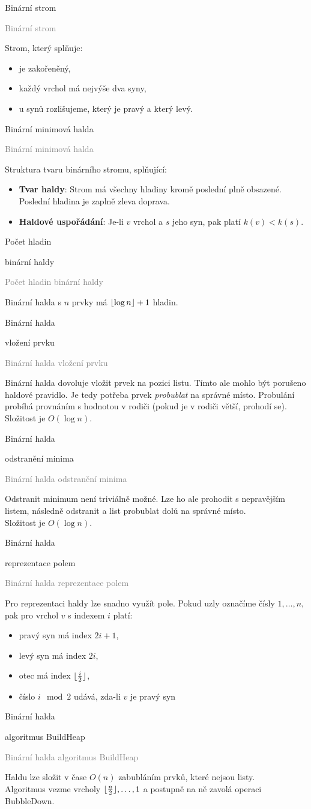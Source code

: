 \documentclass[20pt]{extarticle}
\newcommand{\card}[3][]{
	\vspace*{\fill}

	\newpage
	\topskip0pt
	\vspace*{\fill}
		\Large #2

		\vspace{1cm}
		\normalsize #1
	\vspace*{\fill}
	\newpage

	\small \textcolor{gray}{#2 #1}
	\topskip0pt
	\vspace*{\fill}

	\normalsize
	#3
	\vspace*{\fill}
}
\DeclarePairedDelimiter{\floor}{\lfloor}{\rfloor}
\begin{document}
\begin{center}
\card{Binární strom}{
	Strom, který splňuje:
	\begin{itemize}
		\item je zakořeněný,
		\item každý vrchol má nejvýše dva syny,
		\item u synů rozlišujeme, který je pravý a který levý.
	\end{itemize}
}

\card{Binární minimová halda}{
	Struktura tvaru binárního stromu, splňující:
	\begin{itemize}
		\item \textbf{Tvar haldy}: Strom má všechny hladiny kromě poslední plně obsazené.
		Poslední hladina je zaplně zleva doprava.
		\item \textbf{Haldové uspořádání}: Je-li $v$ vrchol a $s$ jeho syn,
		pak platí $k(v)<k(s)$.
	\end{itemize}
}

\card[binární haldy]{Počet hladin}{
	Binární halda s $n$ prvky má $\floor{\log n} + 1$  hladin.
}

\card[vložení prvku]{Binární halda}{
	Binární halda dovoluje vložit prvek na pozici listu. Tímto ale mohlo být
	porušeno haldové pravidlo. Je tedy potřeba prvek \textit{probublat} na
	správné místo. Probulání probíhá provnáním s hodnotou v rodiči (pokud je v
	rodiči větší, prohodí se).\\
	Složitost je $O(\log n)$.
}

\card[odstranění minima]{Binární halda}{
	Odstranit minimum není triviálně možné. Lze ho ale prohodit s nepravějším
	listem, následně odstranit a list probublat dolů na správné místo.\\
	Složitost je $O(\log n)$.
}

\card[reprezentace polem]{Binární halda}{
	Pro reprezentaci haldy lze snadno využít pole. Pokud uzly označíme čísly
	$1, \dots, n$, pak pro vrchol $v$ s indexem $i$ platí:
	\small
	\begin{itemize}
		\item pravý syn má index $2i + 1$,
		\item levý syn má index $2i$,
		\item otec má index $\floor{\frac{i}{2}}$,
		\item číslo $i \mod 2$ udává, zda-li $v$ je pravý syn
	\end{itemize}
	\normalsize
}

\card[algoritmus BuildHeap]{Binární halda}{
	Haldu lze složit v čase $O(n)$ zabubláním prvků, které nejsou listy.\\
	Algoritmus vezme vrcholy $\floor{\frac{n}{2}}, \dots, 1$ a postupně na ně zavolá
	operaci BubbleDown.
}


\end{center}
\end{document}
